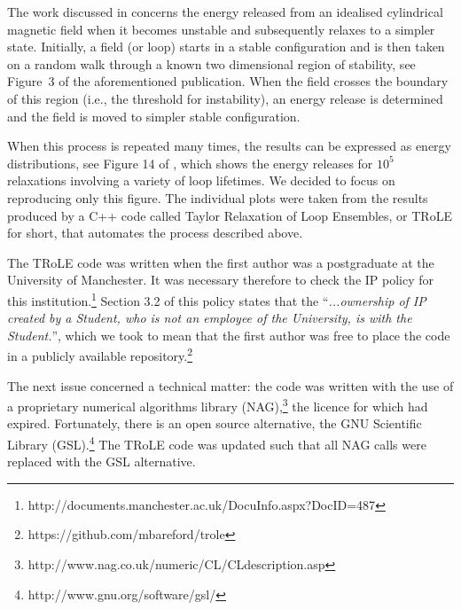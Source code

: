 The work discussed in \cite{bareford2010nanoflare} concerns the energy released from an idealised cylindrical magnetic field when it becomes unstable and subsequently relaxes to a simpler state. Initially, a field (or loop) starts in a stable configuration and is then taken on a random walk through a known two dimensional region of stability, see \mbox{Figure 3} of the aforementioned publication. When the field crosses the boundary of this region (i.e., the threshold for instability), an energy release is determined and the field is moved to simpler stable configuration. 

When this process is repeated many times, the results can be expressed as energy distributions, see Figure 14 of \cite{bareford2010nanoflare}, which shows the energy releases for $10^5$ relaxations involving a variety of loop lifetimes. We decided to focus on reproducing only this figure. The individual plots were taken from the results produced by a C++ code called Taylor Relaxation of Loop Ensembles, or TRoLE for short, that automates the process described above.

The TRoLE code was written when the first author \cite{bareford2010nanoflare} was a postgraduate at the University of Manchester. It was necessary therefore to check the IP policy for this institution.\footnote{http://documents.manchester.ac.uk/DocuInfo.aspx?DocID=487} Section 3.2 of this policy states that the ``\emph{...ownership of IP created by a Student, who is not an employee of the University, is with the Student.}'', which we took to mean that the first author was free to place the code in a publicly available repository.\footnote{https://github.com/mbareford/trole}

The next issue concerned a technical matter: the code was written with the use of a proprietary numerical algorithms library (NAG),\footnote{http://www.nag.co.uk/numeric/CL/CLdescription.asp} the licence for which had expired. Fortunately, there is an open source alternative, the GNU Scientific Library (GSL).\footnote{http://www.gnu.org/software/gsl/} The TRoLE code was updated such that all NAG calls were replaced with the GSL alternative. 

